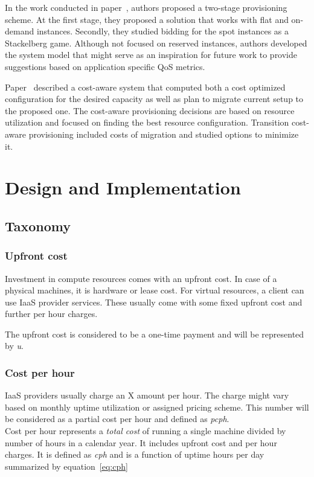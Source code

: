 \documentclass[]{final_report}
\begin{document}
In the work conducted in paper~\cite{6676685}, authors proposed a two-stage provisioning scheme. At the first stage, they proposed a solution that works with flat and on-demand instances. Secondly, they studied bidding for the spot instances as a Stackelberg game. Although not focused on reserved instances, authors developed the system model that might serve as an inspiration for future work to provide suggestions based on application specific QoS metrics. 


Paper~\cite{5961733} described a cost-aware system that computed both a cost optimized configuration for the desired capacity as well as plan to migrate current setup to the proposed one. The cost-aware provisioning decisions are based on resource utilization and focused on finding the best resource configuration. Transition cost-aware provisioning included costs of migration and studied options to minimize it. 




\chapter{Design and Implementation}

\section{Taxonomy}

\subsection{Upfront cost}

Investment in compute resources comes with an upfront cost. In case of a physical machines, it is hardware or lease cost. For virtual resources, a client can use IaaS provider services. These usually come with some fixed upfront cost and further per hour charges. \par

The upfront cost is considered to be a one-time payment and will be represented by \textit{u}.

\subsection{Cost per hour}

IaaS providers usually charge an X amount per hour. The charge might vary based on monthly uptime utilization or assigned pricing scheme. This number will be considered as a partial cost per hour and defined as \textit{pcph}. \\
Cost per hour represents a \textit{total cost} of running a single machine divided by number of hours in a calendar year. It includes upfront cost and per hour charges. It is defined as \textit{cph} and is a function of uptime hours per day summarized by equation~\ref{eq:cph}
\end{document}
